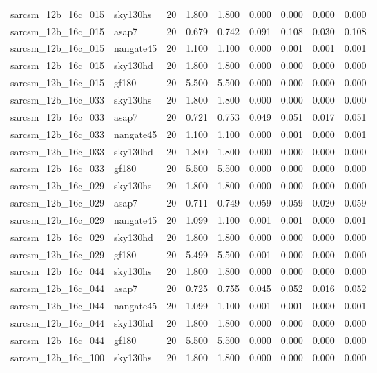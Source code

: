 \begin{tabular}{llrrrrrrr}
sarcsm\_12b\_16c\_015 & sky130hs & 20 & 1.800 & 1.800 & 0.000 & 0.000 & 0.000 & 0.000 \\
sarcsm\_12b\_16c\_015 & asap7 & 20 & 0.679 & 0.742 & 0.091 & 0.108 & 0.030 & 0.108 \\
sarcsm\_12b\_16c\_015 & nangate45 & 20 & 1.100 & 1.100 & 0.000 & 0.001 & 0.001 & 0.001 \\
sarcsm\_12b\_16c\_015 & sky130hd & 20 & 1.800 & 1.800 & 0.000 & 0.000 & 0.000 & 0.000 \\
sarcsm\_12b\_16c\_015 & gf180 & 20 & 5.500 & 5.500 & 0.000 & 0.000 & 0.000 & 0.000 \\
sarcsm\_12b\_16c\_033 & sky130hs & 20 & 1.800 & 1.800 & 0.000 & 0.000 & 0.000 & 0.000 \\
sarcsm\_12b\_16c\_033 & asap7 & 20 & 0.721 & 0.753 & 0.049 & 0.051 & 0.017 & 0.051 \\
sarcsm\_12b\_16c\_033 & nangate45 & 20 & 1.100 & 1.100 & 0.000 & 0.001 & 0.000 & 0.001 \\
sarcsm\_12b\_16c\_033 & sky130hd & 20 & 1.800 & 1.800 & 0.000 & 0.000 & 0.000 & 0.000 \\
sarcsm\_12b\_16c\_033 & gf180 & 20 & 5.500 & 5.500 & 0.000 & 0.000 & 0.000 & 0.000 \\
sarcsm\_12b\_16c\_029 & sky130hs & 20 & 1.800 & 1.800 & 0.000 & 0.000 & 0.000 & 0.000 \\
sarcsm\_12b\_16c\_029 & asap7 & 20 & 0.711 & 0.749 & 0.059 & 0.059 & 0.020 & 0.059 \\
sarcsm\_12b\_16c\_029 & nangate45 & 20 & 1.099 & 1.100 & 0.001 & 0.001 & 0.000 & 0.001 \\
sarcsm\_12b\_16c\_029 & sky130hd & 20 & 1.800 & 1.800 & 0.000 & 0.000 & 0.000 & 0.000 \\
sarcsm\_12b\_16c\_029 & gf180 & 20 & 5.499 & 5.500 & 0.001 & 0.000 & 0.000 & 0.000 \\
sarcsm\_12b\_16c\_044 & sky130hs & 20 & 1.800 & 1.800 & 0.000 & 0.000 & 0.000 & 0.000 \\
sarcsm\_12b\_16c\_044 & asap7 & 20 & 0.725 & 0.755 & 0.045 & 0.052 & 0.016 & 0.052 \\
sarcsm\_12b\_16c\_044 & nangate45 & 20 & 1.099 & 1.100 & 0.001 & 0.001 & 0.000 & 0.001 \\
sarcsm\_12b\_16c\_044 & sky130hd & 20 & 1.800 & 1.800 & 0.000 & 0.000 & 0.000 & 0.000 \\
sarcsm\_12b\_16c\_044 & gf180 & 20 & 5.500 & 5.500 & 0.000 & 0.000 & 0.000 & 0.000 \\
sarcsm\_12b\_16c\_100 & sky130hs & 20 & 1.800 & 1.800 & 0.000 & 0.000 & 0.000 & 0.000 \\

\end{tabular}
